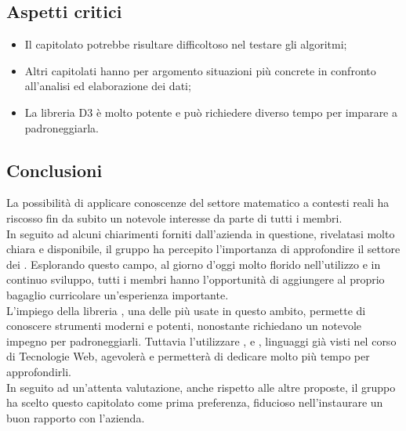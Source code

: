 \subsection{Aspetti critici}
\begin{itemize}
\item Il capitolato potrebbe risultare difficoltoso nel testare gli algoritmi;
\item Altri capitolati hanno per argomento situazioni più concrete in confronto all'analisi ed elaborazione dei dati;
\item La libreria D3 è molto potente e può richiedere diverso tempo per imparare a padroneggiarla. 
\end{itemize}

\subsection{Conclusioni}
La possibilità di applicare conoscenze del settore matematico a contesti reali ha riscosso fin da subito un notevole interesse da parte di tutti i membri.\\ In seguito ad alcuni chiarimenti forniti dall'azienda in questione, rivelatasi molto chiara e disponibile, il gruppo ha percepito l'importanza di approfondire il settore dei . Esplorando questo campo, al giorno d'oggi molto florido nell'utilizzo e in continuo sviluppo, tutti i membri hanno l'opportunità di aggiungere al proprio bagaglio curricolare un'esperienza importante.\\
L'impiego della libreria , una delle più usate in questo ambito, permette di conoscere strumenti moderni e potenti, nonostante richiedano un notevole impegno per padroneggiarli. Tuttavia l'utilizzare ,  e , linguaggi già visti nel corso di Tecnologie Web, agevolerà e permetterà di dedicare molto più tempo per approfondirli.\\In seguito ad un'attenta valutazione, anche rispetto alle altre proposte, il gruppo ha scelto questo capitolato come prima preferenza, fiducioso nell'instaurare un buon rapporto con l'azienda.
